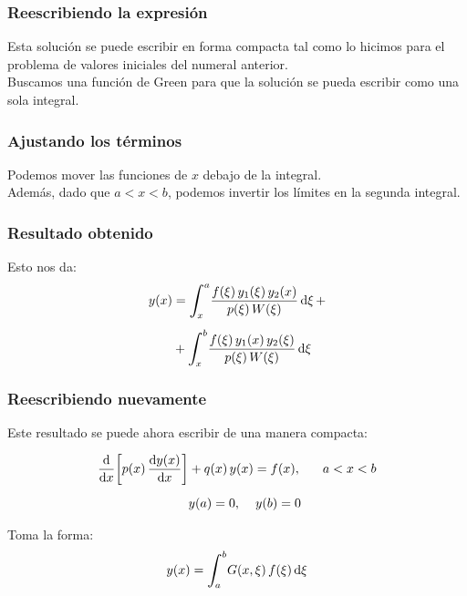 \documentclass[12pt]{beamer}
\begin{document}
\begin{frame}
\frametitle{Reescribiendo la expresión}
Esta solución se puede escribir en forma compacta tal como lo hicimos para el problema de valores iniciales del numeral anterior.
\\
\bigskip
\pause
Buscamos una función de Green para que la solución se pueda escribir como una sola integral.
\end{frame}
\begin{frame}
\frametitle{Ajustando los términos}
Podemos mover las funciones de $x$ debajo de la integral.
\\
\bigskip
\pause
Además, dado que $a < x < b$, podemos invertir los límites en la segunda integral.
\end{frame}
\begin{frame}
\frametitle{Resultado obtenido}
Esto nos da:
\pause
\begin{eqnarray}
\begin{aligned}
y (x) &= \scaleint{6ex}_{\bs x}^{a} \dfrac{f (\xi) \, y_{1} (\xi) \, y_{2} (x)}{p (\xi) \, W (\xi)} \dd{\xi} + \\[0.5em]
&+\scaleint{6ex}_{\bs x}^{b} \dfrac{f (\xi) \, y_{1} (x) \, y_{2} (\xi)}{p (\xi) \, W (\xi)} \dd{\xi}
\end{aligned}
\label{eq:ecuacion_07_30}
\end{eqnarray}
\end{frame}
\begin{frame}
\frametitle{Reescribiendo nuevamente}
Este resultado se puede ahora escribir de una manera compacta:
\end{frame}
\begin{frame}[plain]
\begin{tcolorbox}[title={\centering Solución para problema de CDF con la función de Green}]
\begin{align}
\begin{aligned}
\dv{x} \bigg[ p (x) \, \dv{y (x)}{x} \bigg] &+ q (x) \, y (x) = f (x), \hspace{0.6cm} a < x < b \\[0.5em]
&y (a) = 0, \hspace{0.4cm} y (b) = 0
\end{aligned}
\label{eq:ecuacion_07_31}
\end{align}
\end{tcolorbox}
\end{frame}
\begin{frame}[plain]
\begin{tcolorbox}[title={\centering Solución para problema de CDF con la función de Green}]
Toma la forma:
\begin{align}
y (x) = \scaleint{6ex}_{\bs a}^{b} G (x, \xi) \, f (\xi) \dd{\xi}
\label{eq:ecuacion_07_32}
\end{align}
\end{tcolorbox}
\end{frame}
\end{document}
